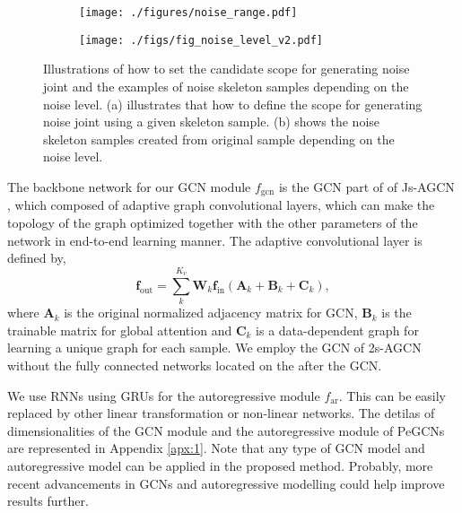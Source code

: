 \documentclass[runningheads]{llncs}
\begin{document}
 \begin{figure*}[t]
        \centering
        \begin{subfigure}{0.23\textwidth}
            \texttt{[image: ./figures/noise\_range.pdf]}
	\caption{}
        \end{subfigure}
        \hfill
        \begin{subfigure}{0.73\textwidth}
            \texttt{[image: ./figs/fig\_noise\_level\_v2.pdf]}
	\caption{}
        \end{subfigure}
        \hfill
        \caption{Illustrations of how to set the candidate scope for generating noise joint and the examples of noise skeleton samples depending on the noise level. (a) illustrates that how to define the scope for generating noise joint using a given skeleton sample. (b) shows the noise skeleton samples created from original sample depending on the noise level.}
\label{fig:gen_noise}  
\vspace{-3ex}
\end{figure*}

The backbone network for our GCN module $f_{\text{gcn}}$ is the GCN part of of Js-AGCN \cite{shi2019two}, which composed of adaptive graph convolutional layers, which can make the topology of the graph optimized together with the other parameters of the network in end-to-end learning manner. The adaptive convolutional layer is defined by,
\begin{equation}
\boldsymbol{f}_{\text{out}}=\sum^{K_{v}}_{k}\boldsymbol{W}_{k}\boldsymbol{f}_{\text{in}}(\boldsymbol{A}_{k}+\boldsymbol{B}_{k}+\boldsymbol{C}_{k}),
 \label{eq:2sagcn}
\end{equation}
where $\boldsymbol{A}_{k}$ is the original normalized adjacency matrix for GCN, $\boldsymbol{B}_{k}$ is the trainable matrix for global attention and $\boldsymbol{C}_{k}$ is a data-dependent graph for learning a unique graph for each sample. We employ the GCN of 2s-AGCN without the fully connected networks located on the after the GCN. 

We use RNNs using GRUs \cite{chung2014empirical} for the autoregressive module $f_{\text{ar}}$. This can be easily replaced by other linear transformation or non-linear networks. The detilas of dimensionalities of the GCN module and the autoregressive module of PeGCNs are represented in Appendix \ref{apx:1}. Note that any type of GCN model and autoregressive model can be applied in the proposed method. Probably, more recent advancements in GCNs and autoregressive modelling could help improve results further. 
\end{document}
